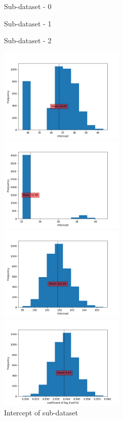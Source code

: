 \documentclass[preprint,12pt]{elsarticle}
\begin{document}
				    
				    
				    \begin{figure}[H]
				    	\begin{multicols}{3}
				    		\centering
				    		Sub-dataset - 0 \par
				    		Sub-dataset - 1 \par
				    		Sub-dataset - 2 \par					
				    	\end{multicols}	  
				    	\begin{multicols}{3}				  	
				    		\includegraphics[width=6cm]{Constant0.png}\par 
				    		\includegraphics[width=6cm]{Constant1.png}\par 
				    		\includegraphics[width=6cm]{Constant2.png}\par 
				    	\end{multicols}
				    	\caption{Intercept of sub-dataset}									  	   				  	
				    	\begin{multicols}{3}
				    		\includegraphics[width=6cm]{logFuel0.png}\par 

\end{multicols}
\end{figure}
\end{document}

